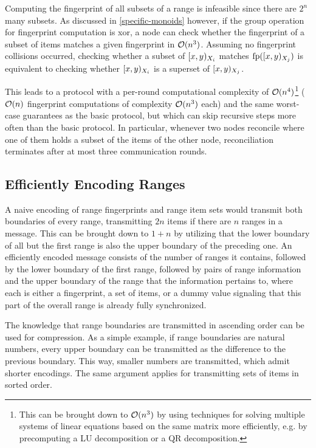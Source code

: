 Computing the fingerprint of all subsets of a range is infeasible since there are $2^n$ many subsets. As discussed in \cref{specific-monoids} however, if the group operation for fingerprint computation is xor, a node can check whether the fingerprint of a subset of items matches a given fingerprint in $\mathcal{O}(n^3)$.
Assuming no fingerprint collisions occurred, checking whether a subset of $[{x},{y})_{X_i}$ matches $\operatorname{fp}([{x},{y})_{X_j})$ is equivalent to checking whether $[{x},{y})_{X_i}$ is a superset of $[{x},{y})_{X_j}$.

This leads to a protocol with a per-round computational complexity of $\mathcal{O}(n^4)$\footnote{This can be brought down to $\mathcal{O}(n^3)$ by using techniques for solving multiple systems of linear equations based on the same matrix more efficiently, e.g. by precomputing a LU decomposition or a QR decomposition.} ($\mathcal{O}(n)$ fingerprint computations of complexity $\mathcal{O}(n^3)$ each) and the same worst-case guarantees as the basic protocol, but which can skip recursive steps more often than the basic protocol. In particular, whenever two nodes reconcile where one of them holds a subset of the items of the other node, reconciliation terminates after at most three communication rounds.

\subsection{Efficiently Encoding Ranges}

A naive encoding of range fingerprints and range item sets would transmit both boundaries of every range, transmitting $2n$ items if there are $n$ ranges in a message. This can be brought down to $1 + n$ by utilizing that the lower boundary of all but the first range is also the upper boundary of the preceding one. An efficiently encoded message consists of the number of ranges it contains, followed by the lower boundary of the first range, followed by pairs of range information and the upper boundary of the range that the information pertains to, where each  is either a fingerprint, a set of items, or a dummy value signaling that this part of the overall range is already fully synchronized.

The knowledge that range boundaries are transmitted in ascending order can be used for compression. As a simple example, if range boundaries are natural numbers, every upper boundary can be transmitted as the difference to the previous boundary. This way, smaller numbers are transmitted, which admit shorter encodings. The same argument applies for transmitting sets of items in sorted order.

